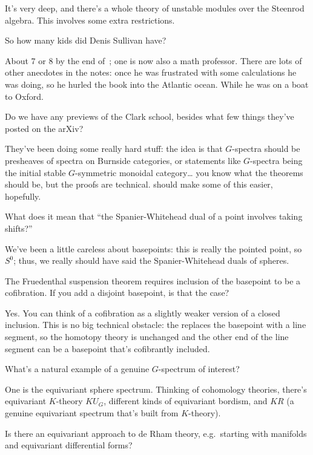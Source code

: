 It's very deep, and there's a whole theory of unstable modules over the Steenrod algebra. This involves some extra
restrictions.
\begin{ques}
So how many kids did Denis Sullivan have?
\end{ques}
About 7 or 8 by the end of~\cite{MITNotes}; one is now also a math professor. There are lots of other anecdotes in
the notes: once he was frustrated with some calculations he was doing, so he hurled the book into the Atlantic
ocean. While he was on a boat to Oxford.
\begin{ques}
Do we have any previews of the Clark school, besides what few things they've posted on the arXiv?
\end{ques}
They've been doing some really hard stuff: the idea is that $G$-spectra should be presheaves of spectra on Burnside
categories, or statements like $G$-spectra being the initial stable $G$-symmetric monoidal category\dots{} you know
what the theorems should be, but the proofs are technical. \cite{CosmicMonadicity} should make some of this easier,
hopefully.
\begin{ques}
What does it mean that ``the Spanier-Whitehead dual of a point involves taking shifts?''
\end{ques}
We've been a little careless about basepoints: this is really the pointed point, so $S^0$; thus, we really should
have said the Spanier-Whitehead duals of spheres.
\begin{ques}
The Fruedenthal suspension theorem requires inclusion of the basepoint to be a cofibration. If you add a disjoint
basepoint, is that the case?
\end{ques}
Yes. You can think of a cofibration as a slightly weaker version of a closed inclusion. This is no big technical
obstacle: the  replaces the basepoint with a line segment, so the homotopy theory is
unchanged and the other end of the line segment can be a basepoint that's cofibrantly included.
\begin{ques}
What's a natural example of a genuine $G$-spectrum of interest?
\end{ques}
One is the equivariant sphere spectrum. Thinking of cohomology theories, there's equivariant $K$-theory
$\mathit{KU}_G$, different kinds of equivariant bordism, and $\mathit{KR}$ (a genuine equivariant spectrum that's
built from $K$-theory).
\begin{ques}
Is there an equivariant approach to de Rham theory, e.g.\ starting with manifolds and equivariant differential
forms?
\end{ques}
